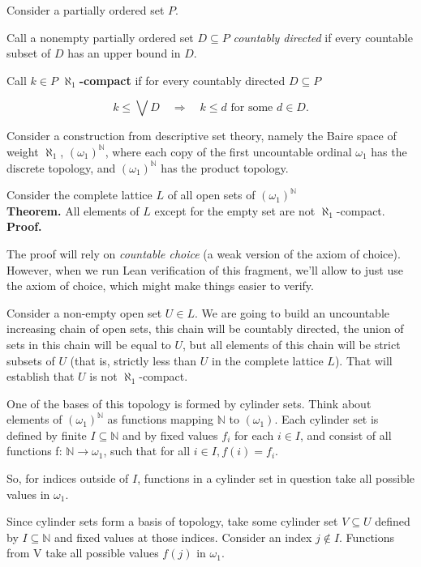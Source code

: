 \documentclass{article}
\begin{document}
Consider a partially ordered set $P$.

Call a nonempty partially ordered set $D \subseteq P$ {\em countably directed} if every countable subset of $D$ has an upper bound in $D$. 

Call $k \in P$ {\bf $\aleph_1$-compact} if for every countably directed $D \subseteq P$

$$
k\leq\bigvee D\quad\Longrightarrow\quad
k\leq d\mbox{ for some }d\in D .
$$ 

Consider a construction from descriptive set theory, namely the Baire space of weight $\aleph_1$, $(\omega_1)^{\mathbb N}$,
where each copy of the first uncountable ordinal $\omega_1$ has the discrete topology, and $(\omega_1)^{\mathbb N}$ has the product topology. 

Consider the complete lattice $L$ of all open sets of $(\omega_1)^{\mathbb N}$\\

{\bf Theorem.} All elements of $L$ except for the empty set are not $\aleph_1$-compact.\\

{\bf Proof.}

The proof will rely on {\em countable choice} (a weak version of the axiom of choice). However, when we run Lean verification
of this fragment, we'll allow to just use the axiom of choice, which might make things easier to verify.

Consider a non-empty open set $U \in L$. We are going to build an uncountable increasing chain of open sets, this chain
will be countably directed, the union of sets in this chain will be equal to $U$, but all elements of this chain will be
strict subsets of $U$ (that is, strictly less than $U$ in the complete lattice $L$). That will establish that $U$ is not $\aleph_1$-compact.

One of the bases of this topology is formed by cylinder sets. Think about elements of $(\omega_1)^{\mathbb N}$
as functions mapping ${\mathbb N}$ to $(\omega_1)$. Each cylinder set is defined by finite $I \subseteq {\mathbb N}$ and by fixed values
$f_i$ for each $i \in I$, and consist of all functions f: ${\mathbb N} \rightarrow \omega_1$, such that
for all $i \in I, f(i) = f_i$.

So, for indices outside of $I$, functions in a cylinder set in question take all possible values in $\omega_1$.

Since cylinder sets form a basis of topology, take some cylinder set $V \subseteq U$ defined by $I \subseteq {\mathbb N}$
and fixed values at those indices. Consider an index $j \not\in I$. Functions from V take all possible values $f(j)$ in $\omega_1$.
\end{document}
